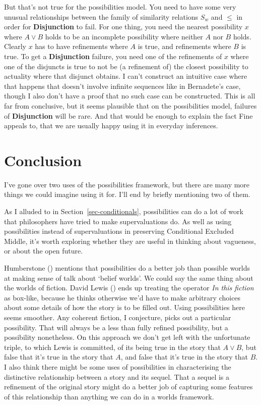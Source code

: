 \documentclass[
  11pt,
  letterpaper,
  DIV=11,
  numbers=noendperiod,
  twoside]{scrartcl}
\newcounter{none} %
\begin{document}
But that's not true for the possibilities model. You need to have some
very unusual relationships between the family of similarity relations
\(S_w\) and \(\leqslant\) in order for \textbf{Disjunction} to fail. For
one thing, you need the nearest possibility \(x\) where \(A \vee B\)
holds to be an incomplete possibility where neither \(A\) nor \(B\)
holds. Clearly \(x\) has to have refinements where \(A\) is true, and
refinements where \(B\) is true. To get a \textbf{Disjunction} failure,
you need one of the refinements of \(x\) where one of the disjuncts is
true to not be (a refinement of) the closest possibility to actuality
where that disjunct obtains. I can't construct an intuitive case where
that happens that doesn't involve infinite sequences like in Bernadete's
case, though I also don't have a proof that no such case can be
constructed. This is all far from conclusive, but it seems plausible
that on the possibilities model, failures of \textbf{Disjunction} will
be rare. And that would be enough to explain the fact Fine appeals to,
that we are usually happy using it in everyday inferences.

\section{Conclusion}\label{sec-conclusion}

I've gone over two uses of the possibilities framework, but there are
many more things we could imagine using it for. I'll end by briefly
mentioning two of them.

As I alluded to in Section~\ref{sec-conditionals}, possibilities can do
a lot of work that philosophers have tried to make supervaluations do.
As well as using possibilities instead of supervaluations in preserving
Conditional Excluded Middle, it's worth exploring whether they are
useful in thinking about vagueness, or about the open future.

Humberstone () mentions that
possibilities do a better job than possible worlds at making sense of
talk about `belief worlds'. We could say the same thing about the worlds
of fiction. David Lewis () ends up
treating the operator \emph{In this fiction} as box-like, because he
thinks otherwise we'd have to make arbitrary choices about some details
of how the story is to be filled out. Using possibilities here seems
smoother. Any coherent fiction, I conjecture, picks out a particular
possibility. That will always be a less than fully refined possibility,
but a possibility nonetheless. On this approach we don't get left with
the unfortunate triple, to which Lewis is committed, of its being true
in the story that \(A \vee B\), but false that it's true in the story
that \(A\), and false that it's true in the story that \(B\). I also
think there might be some uses of possibilities in characterising the
distinctive relationship between a story and its sequel. That a sequel
is a refinement of the original story might do a better job of capturing
some features of this relationship than anything we can do in a worlds
framework.
\end{document}
